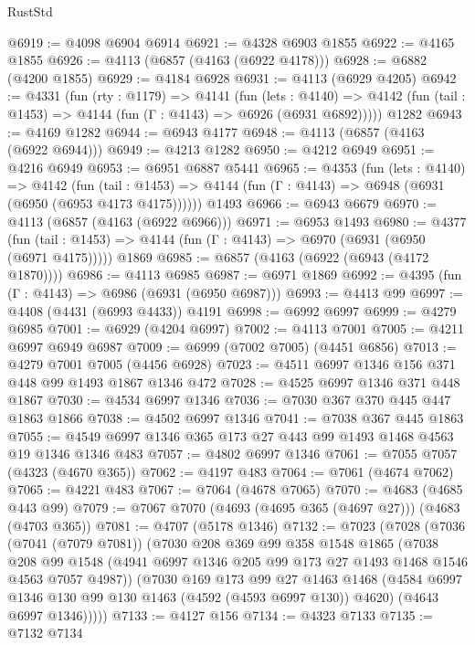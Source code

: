\begin{lexlean}{RustStd}
\begin{coremodule}
@6919 := @4098 @6904 @6914
@6921 := @4328 @6903 @1855
@6922 := @4165 @1855
@6926 := @4113 (@6857 (@4163 (@6922 @4178)))
@6928 := @6882 (@4200 @1855)
@6929 := @4184 @6928
@6931 := @4113 (@6929 @4205)
@6942 := @4331
    (fun (rty : @1179) =>
    @4141
      (fun (lets : @4140) =>
      @4142 (fun (tail : @1453) => @4144 (fun (Γ : @4143) => @6926 (@6931 @6892)))))
    @1282
@6943 := @4169 @1282
@6944 := @6943 @4177
@6948 := @4113 (@6857 (@4163 (@6922 @6944)))
@6949 := @4213 @1282
@6950 := @4212 @6949
@6951 := @4216 @6949
@6953 := @6951 @6887 @5441
@6965 := @4353
    (fun (lets : @4140) =>
    @4142
      (fun (tail : @1453) => @4144 (fun (Γ : @4143) => @6948 (@6931 (@6950 (@6953 @4173 @4175))))))
    @1493
@6966 := @6943 @6679
@6970 := @4113 (@6857 (@4163 (@6922 @6966)))
@6971 := @6953 @1493
@6980 := @4377
    (fun (tail : @1453) => @4144 (fun (Γ : @4143) => @6970 (@6931 (@6950 (@6971 @4175)))))
    @1869
@6985 := @6857 (@4163 (@6922 (@6943 (@4172 @1870))))
@6986 := @4113 @6985
@6987 := @6971 @1869
@6992 := @4395 (fun (Γ : @4143) => @6986 (@6931 (@6950 @6987)))
@6993 := @4413 @99
@6997 := @4408 (@4431 (@6993 @4433)) @4191
@6998 := @6992 @6997
@6999 := @4279 @6985
@7001 := @6929 (@4204 @6997)
@7002 := @4113 @7001
@7005 := @4211 @6997 @6949 @6987
@7009 := @6999 (@7002 @7005) (@4451 @6856)
@7013 := @4279 @7001 @7005 (@4456 @6928)
@7023 := @4511 @6997 @1346 @156 @371 @448 @99 @1493 @1867 @1346 @472
@7028 := @4525 @6997 @1346 @371 @448 @1867
@7030 := @4534 @6997 @1346
@7036 := @7030 @367 @370 @445 @447 @1863 @1866
@7038 := @4502 @6997 @1346
@7041 := @7038 @367 @445 @1863
@7055 := @4549 @6997 @1346 @365 @173 @27 @443 @99 @1493 @1468 @4563 @19 @1346 @1346 @483
@7057 := @4802 @6997 @1346
@7061 := @7055 @7057 (@4323 (@4670 @365))
@7062 := @4197 @483
@7064 := @7061 (@4674 @7062)
@7065 := @4221 @483
@7067 := @7064 (@4678 @7065)
@7070 := @4683 (@4685 @443 @99)
@7079 := @7067 @7070 (@4693 (@4695 @365 (@4697 @27))) (@4683 (@4703 @365))
@7081 := @4707 (@5178 @1346)
@7132 := @7023
    (@7028
      (@7036
        (@7041 (@7079 @7081))
        (@7030
          @208
          @369
          @99
          @358
          @1548
          @1865
          (@7038
            @208
            @99
            @1548
            (@4941 @6997 @1346 @205 @99 @173 @27 @1493 @1468 @1546 @4563 @7057 @4987))
          (@7030
            @169
            @173
            @99
            @27
            @1463
            @1468
            (@4584 @6997 @1346 @130 @99 @130 @1463 (@4592 (@4593 @6997 @130)) @4620)
            (@4643 @6997 @1346)))))
@7133 := @4127 @156
@7134 := @4323 @7133
@7135 := @7132 @7134

\end{coremodule}
\end{lexlean}

